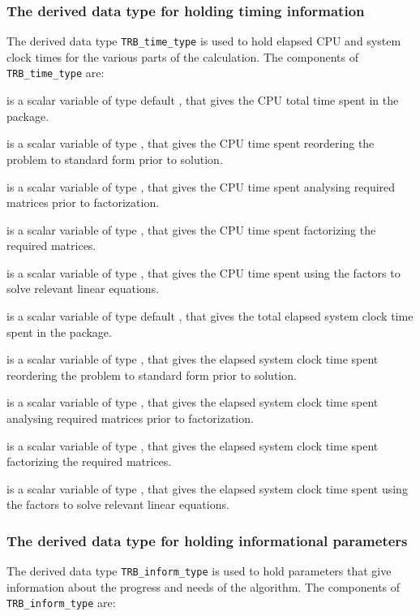 \documentclass{galahad}
\newcommand{\packagename}{TRB}
\begin{document}
\subsubsection{The derived data type for holding timing
 information}\label{typetime}
The derived data type
{\tt \packagename\_time\_type}
is used to hold elapsed CPU and system clock times for the various parts
of the calculation. The components of
{\tt \packagename\_time\_type}
are:
\begin{description}
 is a scalar variable of type default \real, that gives
 the CPU total time spent in the package.

 is a scalar variable of type \realdp, that gives
 the CPU time spent reordering the problem to standard form prior to solution.

 is a scalar variable of type \realdp, that gives
 the CPU time spent analysing required matrices prior to factorization.

 is a scalar variable of type \realdp, that gives
 the CPU time spent factorizing the required matrices.

 is a scalar variable of type \realdp, that gives
 the CPU time spent using the factors to solve relevant linear equations.

 is a scalar variable of type default \real, that gives
 the total elapsed system clock time spent in the package.

 is a scalar variable of type \realdp, that gives
 the elapsed system clock time spent reordering the problem to standard form
prior to solution.

 is a scalar variable of type \realdp, that gives
 the  elapsed system clock time spent analysing required matrices prior to
factorization.

 is a scalar variable of type \realdp, that gives
 the  elapsed system clock time spent factorizing the required matrices.

 is a scalar variable of type \realdp, that gives
 the  elapsed system clock time spent using the factors to solve relevant
linear equations.

\end{description}


\subsubsection{The derived data type for holding informational
 parameters}\label{typeinform}
The derived data type
{\tt \packagename\_inform\_type}
is used to hold parameters that give information about the progress and needs
of the algorithm. The components of
{\tt \packagename\_inform\_type}
are:
\end{document}
